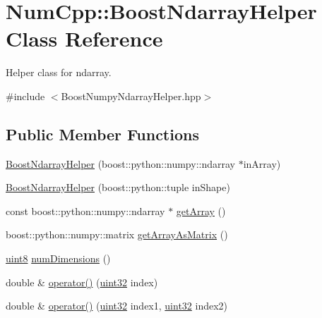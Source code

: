 \hypertarget{class_num_cpp_1_1_boost_ndarray_helper}{}\section{Num\+Cpp\+:\+:Boost\+Ndarray\+Helper Class Reference}
\label{class_num_cpp_1_1_boost_ndarray_helper}


Helper class for ndarray.  




{\ttfamily \#include $<$Boost\+Numpy\+Ndarray\+Helper.\+hpp$>$}

\subsection*{Public Member Functions}
\begin{DoxyCompactItemize}
\item 
\mbox{\hyperlink{class_num_cpp_1_1_boost_ndarray_helper_ab19508d6f9bc79d031152eb2640df6ac}{Boost\+Ndarray\+Helper}} (boost\+::python\+::numpy\+::ndarray $\ast$in\+Array)
\item 
\mbox{\hyperlink{class_num_cpp_1_1_boost_ndarray_helper_acd629d37df30bd06c40165648a7ddffd}{Boost\+Ndarray\+Helper}} (boost\+::python\+::tuple in\+Shape)
\item 
const boost\+::python\+::numpy\+::ndarray $\ast$ \mbox{\hyperlink{class_num_cpp_1_1_boost_ndarray_helper_a1c0c7067349cfa0f1847d7a7059edc43}{get\+Array}} ()
\item 
boost\+::python\+::numpy\+::matrix \mbox{\hyperlink{class_num_cpp_1_1_boost_ndarray_helper_a3e6232d550be5b963bc0bb5ab20d8147}{get\+Array\+As\+Matrix}} ()
\item 
\mbox{\hyperlink{namespace_num_cpp_aee396d0469d6031cd18118c0a45bcdda}{uint8}} \mbox{\hyperlink{class_num_cpp_1_1_boost_ndarray_helper_ae0d6fea21438905e49743a4daacc0a04}{num\+Dimensions}} ()
\item 
double \& \mbox{\hyperlink{class_num_cpp_1_1_boost_ndarray_helper_a16503ef242ff43264f26e8739660af12}{operator()}} (\mbox{\hyperlink{namespace_num_cpp_a36f388e948380413c63011cab9b7fbd5}{uint32}} index)
\item 
double \& \mbox{\hyperlink{class_num_cpp_1_1_boost_ndarray_helper_a2494f3da626eb7821df4223d6db19383}{operator()}} (\mbox{\hyperlink{namespace_num_cpp_a36f388e948380413c63011cab9b7fbd5}{uint32}} index1, \mbox{\hyperlink{namespace_num_cpp_a36f388e948380413c63011cab9b7fbd5}{uint32}} index2)
\item 

\end{DoxyCompactItemize}
